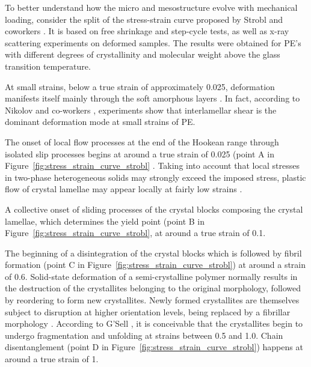 To better understand how the micro and mesostructure evolve with mechanical loading, consider the split of the stress-strain curve proposed by Strobl and coworkers \citep{hissNetworkStretchingSlip1999, hobeikaTemperatureStrainRate2000, hongModelTreatingTensile2004, hongModelTreatmentTensile2004, naViscousForceDominatedTensileDeformation2006}.
It is based on free shrinkage and step-cycle tests, as well as x-ray scattering experiments on deformed samples.
The results were obtained for PE's with different degrees of crystallinity and molecular weight above the glass transition temperature.

At small strains, below a true strain of approximately \num{0.025}, deformation manifests itself mainly through the soft amorphous layers \citep{patlazhanStructuralMechanicsSemicrystalline2012}.
In fact, according to Nikolov and co-workers  \citep{nikolovMicroMacroConstitutive2000, nikolovMultiscaleConstitutiveModeling2002}, experiments show that interlamellar shear is the dominant deformation mode at small strains of PE.

The onset of local flow processes at the end of the Hookean range through isolated slip processes begins at around a true strain of \num{0.025} (point A in Figure~\ref{fig:stress_strain_curve_strobl} \citep{hissNetworkStretchingSlip1999}.
Taking into account that local stresses in two-phase heterogeneous solids may strongly exceed the imposed stress, plastic flow of crystal lamellae may appear locally at fairly low strains \citep{patlazhanStructuralMechanicsSemicrystalline2012}.

A collective onset of sliding processes of the crystal blocks composing the crystal lamellae, which determines the yield point (point B in Figure~\ref{fig:stress_strain_curve_strobl}, at around a true strain of 0.1.

The beginning of a disintegration of the crystal blocks which is followed by fibril formation (point C in Figure~\ref{fig:stress_strain_curve_strobl}) at around a strain of 0.6.
Solid-state deformation of a semi-crystalline polymer normally results in the destruction of the crystallites belonging to the original morphology, followed by reordering to form new crystallites.
Newly formed crystallites are themselves subject to disruption at higher orientation levels, being replaced by a fibrillar morphology  \citep{peacockHandbookPolyethyleneStructures2014}.
According to G'Sell \citep{gsellEvolutionMicrostructureSemicrystalline1994}, it is conceivable that the crystallites begin to undergo fragmentation and unfolding at strains between 0.5 and 1.0.
Chain disentanglement (point D in Figure~\ref{fig:stress_strain_curve_strobl}) happens at around a true strain of 1.

